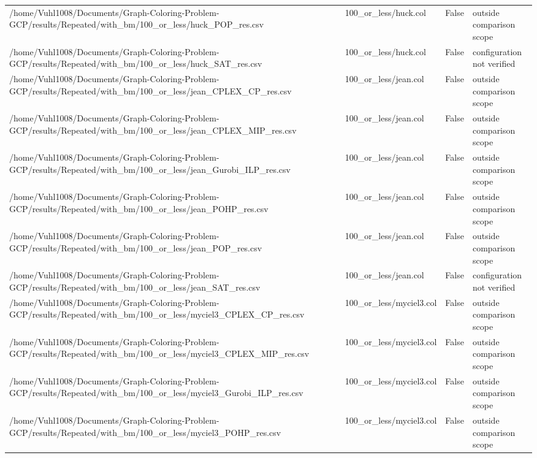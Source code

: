 \begin{table}[htbp]
\begin{tabular}{llll}
/home/Vuhl1008/Documents/Graph-Coloring-Problem-GCP/results/Repeated/with\_bm/100\_or\_less/huck\_POP\_res.csv & 100\_or\_less/huck.col & False & outside comparison scope \\
/home/Vuhl1008/Documents/Graph-Coloring-Problem-GCP/results/Repeated/with\_bm/100\_or\_less/huck\_SAT\_res.csv & 100\_or\_less/huck.col & False & configuration not verified \\
/home/Vuhl1008/Documents/Graph-Coloring-Problem-GCP/results/Repeated/with\_bm/100\_or\_less/jean\_CPLEX\_CP\_res.csv & 100\_or\_less/jean.col & False & outside comparison scope \\
/home/Vuhl1008/Documents/Graph-Coloring-Problem-GCP/results/Repeated/with\_bm/100\_or\_less/jean\_CPLEX\_MIP\_res.csv & 100\_or\_less/jean.col & False & outside comparison scope \\
/home/Vuhl1008/Documents/Graph-Coloring-Problem-GCP/results/Repeated/with\_bm/100\_or\_less/jean\_Gurobi\_ILP\_res.csv & 100\_or\_less/jean.col & False & outside comparison scope \\
/home/Vuhl1008/Documents/Graph-Coloring-Problem-GCP/results/Repeated/with\_bm/100\_or\_less/jean\_POHP\_res.csv & 100\_or\_less/jean.col & False & outside comparison scope \\
/home/Vuhl1008/Documents/Graph-Coloring-Problem-GCP/results/Repeated/with\_bm/100\_or\_less/jean\_POP\_res.csv & 100\_or\_less/jean.col & False & outside comparison scope \\
/home/Vuhl1008/Documents/Graph-Coloring-Problem-GCP/results/Repeated/with\_bm/100\_or\_less/jean\_SAT\_res.csv & 100\_or\_less/jean.col & False & configuration not verified \\
/home/Vuhl1008/Documents/Graph-Coloring-Problem-GCP/results/Repeated/with\_bm/100\_or\_less/myciel3\_CPLEX\_CP\_res.csv & 100\_or\_less/myciel3.col & False & outside comparison scope \\
/home/Vuhl1008/Documents/Graph-Coloring-Problem-GCP/results/Repeated/with\_bm/100\_or\_less/myciel3\_CPLEX\_MIP\_res.csv & 100\_or\_less/myciel3.col & False & outside comparison scope \\
/home/Vuhl1008/Documents/Graph-Coloring-Problem-GCP/results/Repeated/with\_bm/100\_or\_less/myciel3\_Gurobi\_ILP\_res.csv & 100\_or\_less/myciel3.col & False & outside comparison scope \\
/home/Vuhl1008/Documents/Graph-Coloring-Problem-GCP/results/Repeated/with\_bm/100\_or\_less/myciel3\_POHP\_res.csv & 100\_or\_less/myciel3.col & False & outside comparison scope \\

\end{tabular}
\end{table}
